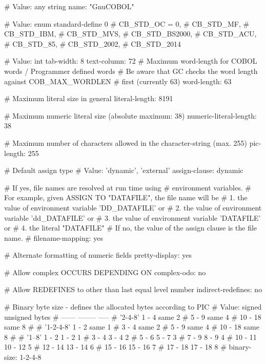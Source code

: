 

# Value: any string
name: "GnuCOBOL"

# Value: enum
standard-define			0
#        CB_STD_OC = 0,
#        CB_STD_MF,
#        CB_STD_IBM,
#        CB_STD_MVS,
#        CB_STD_BS2000,
#        CB_STD_ACU,
#        CB_STD_85,
#        CB_STD_2002,
#        CB_STD_2014

# Value: int
tab-width:			8
text-column:			72
# Maximum word-length for COBOL words / Programmer defined words
# Be aware that GC checks the word length against COB_MAX_WORDLEN
# first (currently 63)
word-length:			63

# Maximum literal size in general
literal-length:			8191

# Maximum numeric literal size (absolute maximum: 38)
numeric-literal-length:		38

# Maximum number of characters allowed in the character-string (max. 255)
pic-length:			255

# Default assign type
# Value: 'dynamic', 'external'
assign-clause:			dynamic 

# If yes, file names are resolved at run time using
# environment variables.
# For example, given ASSIGN TO "DATAFILE", the file name will be
#  1. the value of environment variable 'DD_DATAFILE' or
#  2. the value of environment variable 'dd_DATAFILE' or
#  3. the value of environment variable 'DATAFILE' or
#  4. the literal "DATAFILE"
# If no, the value of the assign clause is the file name.
#
filename-mapping:		yes

# Alternate formatting of numeric fields
pretty-display:			yes

# Allow complex OCCURS DEPENDING ON
complex-odo:			no

# Allow REDEFINES to other than last equal level number
indirect-redefines:		no

# Binary byte size - defines the allocated bytes according to PIC
# Value:         signed  unsigned  bytes
#                ------  --------  -----
# '2-4-8'        1 -  4    same        2
#                5 -  9    same        4
#               10 - 18    same        8
#
# '1-2-4-8'      1 -  2    same        1
#                3 -  4    same        2
#                5 -  9    same        4
#               10 - 18    same        8
#
# '1--8'         1 -  2    1 -  2      1
#                3 -  4    3 -  4      2
#                5 -  6    5 -  7      3
#                7 -  9    8 -  9      4
#               10 - 11   10 - 12      5
#               12 - 14   13 - 14      6
#               15 - 16   15 - 16      7
#               17 - 18   17 - 18      8
#
binary-size:			1-2-4-8

